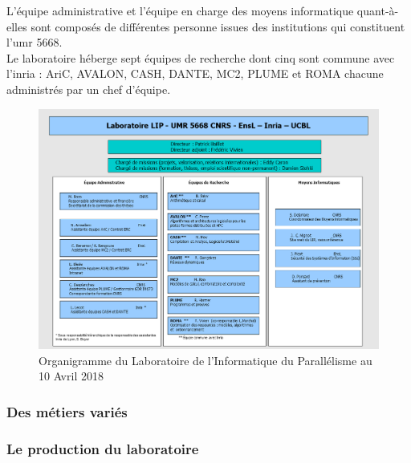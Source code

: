 L'équipe administrative et l'équipe en charge des moyens informatique quant-à-elles sont composés de différentes personne issues des institutions qui constituent l'\gls{umr} 5668.\\

Le laboratoire héberge sept équipes de recherche dont cinq sont commune avec l'\gls{inria} : AriC, AVALON, CASH, DANTE, MC2, PLUME et ROMA chacune administrés par un chef d'équipe.

\begin{figure}[h]
	\center
	\includegraphics[scale=0.5]{partie1/images/organigramme.png}
	\caption{Organigramme du Laboratoire de l'Informatique du Parallélisme au 10 Avril 2018 \cite{organigramme}}
\end{figure}
\subsubsection{Des métiers variés}

\subsubsection{Le production du laboratoire}
